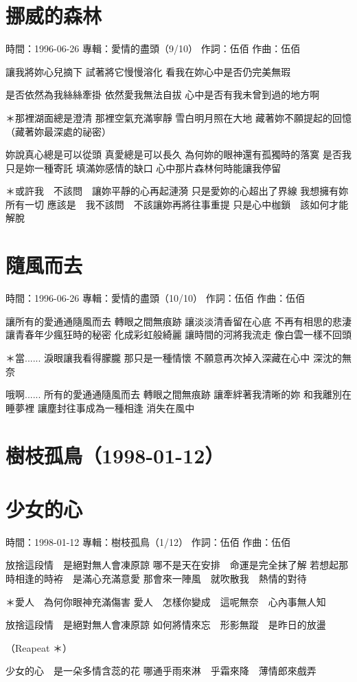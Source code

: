 \documentclass[UTF8,a4paper,oneside,twocolumn,12pt]{ctexbook}
\newcommand{\infopair}[2]{\textbullet #1：#2}
\newcommand{\zc}[1][伍佰]{\infopair{作詞}{#1}}
\newcommand{\zq}[1][伍佰]{\infopair{作曲}{#1}}
\newcommand{\zj}[1]{\infopair{專輯}{#1}}
\newcommand{\sj}[1]{\infopair{時間}{#1}}
\newenvironment{info}{\begin{flushleft}\kaishu
	}
	{\end{flushleft}\normalsize\yahei\par}
\newenvironment{lyric}{
	}
{}
\begin{document}
\section{挪威的森林}
\begin{info}
	\sj{1996-06-26}
	\zj{愛情的盡頭（9/10）}
	\zc
	\zq
\end{info}
\begin{lyric}
	讓我將妳心兒摘下
	試著將它慢慢溶化
	看我在妳心中是否仍完美無瑕

	是否依然為我絲絲牽掛
	依然愛我無法自拔
	心中是否有我未曾到過的地方啊

	＊那裡湖面總是澄清
	那裡空氣充滿寧靜
	雪白明月照在大地
	藏著妳不願提起的回憶
	（藏著妳最深處的祕密）

	妳說真心總是可以從頭
	真愛總是可以長久
	為何妳的眼神還有孤獨時的落寞
	是否我只是妳一種寄託
	填滿妳感情的缺口
	心中那片森林何時能讓我停留

	＊或許我　不該問　讓妳平靜的心再起漣漪
	只是愛妳的心超出了界線
	我想擁有妳所有一切
	應該是　我不該問　不該讓妳再將往事重提
	只是心中枷鎖　該如何才能解脫
\end{lyric}

\section{隨風而去}
\begin{info}
	\sj{1996-06-26}
	\zj{愛情的盡頭（10/10）}
	\zc
	\zq
\end{info}
\begin{lyric}
	讓所有的愛通通隨風而去
	轉眼之間無痕跡
	讓淡淡清香留在心底
	不再有相思的悲淒
	讓青春年少瘋狂時的秘密
	化成彩虹般綺麗
	讓時間的河將我流走
	像白雲一樣不回頭

	＊當......
	淚眼讓我看得朦朧
	那只是一種情懷
	不願意再次掉入深藏在心中
	深沈的無奈

	哦啊......
	所有的愛通通隨風而去
	轉眼之間無痕跡
	讓牽絆著我清晰的妳
	和我離別在睡夢裡
	讓塵封往事成為一種相逢
	消失在風中
\end{lyric}

\section*{樹枝孤鳥（1998-01-12）}
\section{少女的心}
\begin{info}
	\sj{1998-01-12}
	\zj{樹枝孤鳥（1/12）}
	\zc
	\zq
\end{info}
\begin{lyric}
	放捨這段情　是絕對無人會凍原諒
	哪不是天在安排　命運是完全抹了解
	若想起那時相逢的時袸　是滿心充滿意愛
	那會來一陣風　就吹散我　熱情的對待

	＊愛人　為何你眼神充滿傷害
	愛人　怎樣你變成　這呢無奈　心內事無人知

	放捨這段情　是絕對無人會凍原諒
	如何將情來忘　形影無蹤　是昨日的放盪

	（Reapeat ＊）

	少女的心　是一朵多情含蕊的花
	哪通乎雨來淋　乎霜來降　薄情郎來戲弄
\end{lyric}
\end{document}
